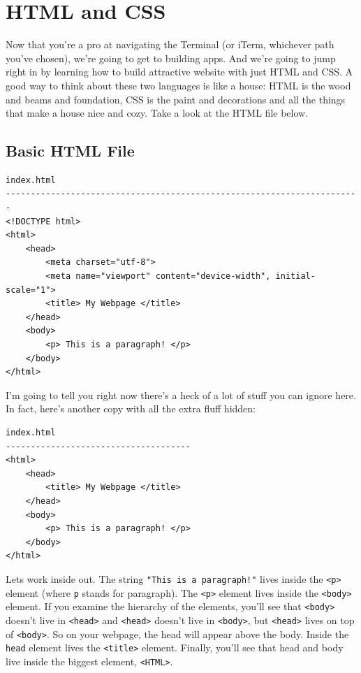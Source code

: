 \documentclass[12pt, letterpaper]{article}
\begin{document}
\section{HTML and CSS}

Now that you're a pro at navigating the Terminal (or iTerm, whichever path you've chosen), we're going to get to building
apps. And we're going to jump right in by learning how to build attractive website with just HTML and CSS. A good
way to think about these two languages is like a house: HTML is the wood and beams and foundation, CSS is the paint
and decorations and all the things that make a house nice and cozy. Take a look at the HTML file below. \\

\subsection*{Basic HTML File}

\begin{verbatim}
index.html
-----------------------------------------------------------------------
<!DOCTYPE html>
<html>
    <head>
        <meta charset="utf-8">
        <meta name="viewport" content="device-width", initial-scale="1">
        <title> My Webpage </title>
    </head>
    <body>
        <p> This is a paragraph! </p>
    </body>
</html>
\end{verbatim}

I'm going to tell you right now there's a heck of a lot of stuff you can ignore here. In fact, here's another copy with 
all the extra fluff hidden:

\begin{verbatim}
index.html
-------------------------------------
<html>
    <head>
        <title> My Webpage </title>
    </head>
    <body>
        <p> This is a paragraph! </p>
    </body>
</html>
\end{verbatim}

Lets work inside out. The string \verb+"This is a paragraph!"+ lives inside the \verb+<p>+ element (where \verb+p+
stands for paragraph). The \verb+<p>+ element lives inside the \verb+<body>+ element. If you examine the hierarchy
of the elements, you'll see that \verb+<body>+ doesn't live in \verb+<head>+ and \verb+<head>+ doesn't live in \verb+<body>+, but 
\verb+<head>+ lives on top of \verb+<body>+. So on your webpage, the head will appear above the body. Inside the \verb+head+ element lives the 
\verb+<title>+ element. Finally, you'll see that head and body live inside the biggest element, \verb+<HTML>+. \\
\end{document}
